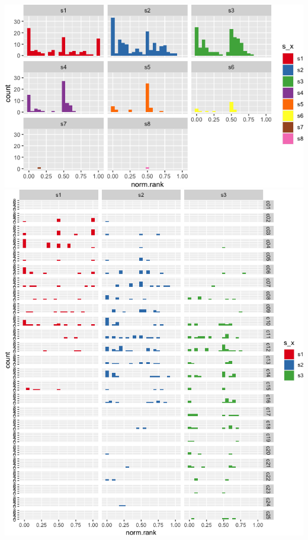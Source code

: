 \documentclass[
]{article}
\begin{document}
\includegraphics{vn_files/figure-latex/crank3-1.png}
\includegraphics{vn_files/figure-latex/crank4-1.png}
\end{document}
